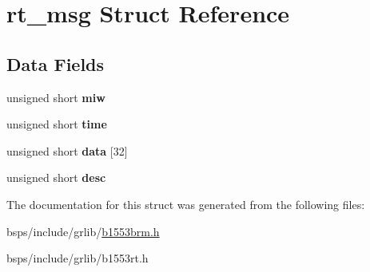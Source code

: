 \hypertarget{structrt__msg}{}\section{rt\+\_\+msg Struct Reference}
\label{structrt__msg}
\subsection*{Data Fields}
\begin{DoxyCompactItemize}
\item 
\mbox{\label{structrt__msg_a035d08da69bbdb88ea89afb82c7af03d}} 
unsigned short {\bfseries miw}
\item 
\mbox{\label{structrt__msg_a7f082612e2c952fb26117a4a10f2ef61}} 
unsigned short {\bfseries time}
\item 
\mbox{\label{structrt__msg_a3b8d07d2407e481a31352b722c222a10}} 
unsigned short {\bfseries data} \mbox{[}32\mbox{]}
\item 
\mbox{\label{structrt__msg_a6163aaffd369eba2f1561ceda912aa46}} 
unsigned short {\bfseries desc}
\end{DoxyCompactItemize}


The documentation for this struct was generated from the following files\+:\begin{DoxyCompactItemize}
\item 
bsps/include/grlib/\mbox{\hyperlink{b1553brm_8h}{b1553brm.\+h}}\item 
bsps/include/grlib/b1553rt.\+h\end{DoxyCompactItemize}
